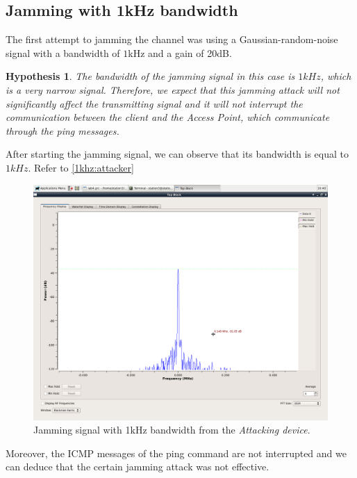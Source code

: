 \documentclass[12pt,a4paper]{article}
\newtheorem{hypo}{Hypothesis}
\begin{document}
\subsection{Jamming with 1kHz bandwidth}

	The first attempt to jamming the channel was using a Gaussian-random-noise signal with a bandwidth of $1$kHz and a gain of 20dB.
	\begin{hypo}
		The bandwidth of the jamming signal in this case is $1kHz$, which is a very narrow signal. Therefore, we expect that this jamming attack will not significantly affect the transmitting signal and it will not interrupt the communication between the client and the Access Point, which communicate through the ping messages.
	\end{hypo}

	After starting the jamming signal, we can observe that its bandwidth is equal to $1kHz$. Refer to \autoref{1khz:attacker}
	\begin{figure}
		\includegraphics[width=\textwidth]{images/attack_1kHz.png}
		\caption{Jamming signal with 1kHz bandwidth from the \emph{Attacking device}.}
		\label{1khz:attacker}
	\end{figure}
	
	 Moreover, the ICMP messages of the ping command are not interrupted and we can deduce that the certain jamming attack was not effective.
\end{document}
